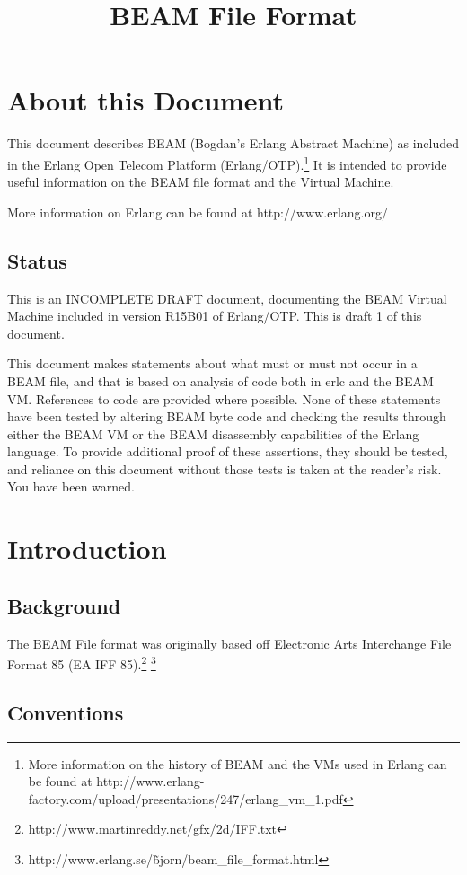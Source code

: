 \documentclass{article}
\title{BEAM File Format}
\begin{document}
\maketitle
\pagebreak
\tableofcontents
\pagebreak
\section{About this Document}

This document describes BEAM (Bogdan's Erlang Abstract Machine)
as included in the Erlang Open Telecom Platform (Erlang/OTP).\footnote{More
information on the history of BEAM and the VMs used in Erlang can be
found at http://www.erlang-factory.com/upload/presentations/247/erlang\_vm\_1.pdf}
It is intended to provide useful information on the BEAM file format
and the Virtual Machine.

More information on Erlang can be found at http://www.erlang.org/

\subsection{Status}
This is an INCOMPLETE DRAFT document,
documenting the BEAM Virtual Machine included in version R15B01 of Erlang/OTP.
This is draft 1 of this document. 

This document makes statements about what must or must not occur in a BEAM file,
and that is based on analysis of code both in erlc and the BEAM VM.
References to code are provided where possible. None of these statements
have been tested by altering BEAM byte code and checking the
results through either the BEAM VM or the BEAM disassembly capabilities of 
the Erlang language.  To provide additional proof of these assertions, 
they should be tested, and reliance on this document without those 
tests is taken at the reader's risk.  You have been warned.

\section{Introduction}
\subsection{Background}
The BEAM File format was originally based off
Electronic Arts Interchange File Format 85
(EA IFF 85).\footnote{http://www.martinreddy.net/gfx/2d/IFF.txt}
\footnote{http://www.erlang.se/\~bjorn/beam\_file\_format.html}

\subsection{Conventions}
\end{document}
